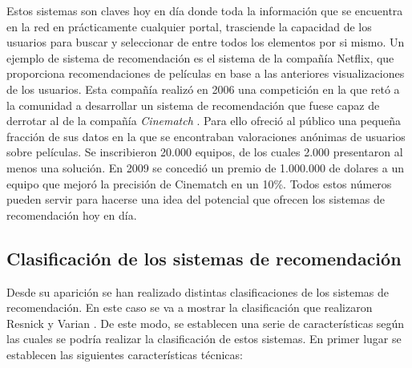 Estos sistemas son claves hoy en día donde toda la información que se encuentra en la red en prácticamente cualquier portal, trasciende la capacidad de los usuarios para buscar y seleccionar de entre todos los elementos por si mismo. Un ejemplo de sistema de recomendación es el sistema de la compañía Netflix, que proporciona recomendaciones de películas en base a las anteriores visualizaciones de los usuarios. Esta compañía realizó en 2006 una competición en la que retó a la comunidad a desarrollar un sistema de recomendación que fuese capaz de derrotar al de la compañía \textit{Cinematch}%
. Para ello ofreció al público una pequeña fracción de sus datos en la que se encontraban valoraciones anónimas de usuarios sobre películas. Se inscribieron 20.000 equipos, de los cuales 2.000 presentaron al menos una solución. En 2009 se concedió un premio de 1.000.000 de dolares a un equipo que mejoró la precisión de Cinematch en un 10\%. Todos estos números pueden servir para hacerse una idea del potencial que ofrecen los sistemas de recomendación hoy en día.

\subsection{Clasificación de los sistemas de recomendación}

Desde su aparición se han realizado distintas clasificaciones de los sistemas de recomendación. En este caso se va a mostrar la clasificación que realizaron Resnick y Varian \cite{Resnick:1997:RS:245108.245121}. De este modo, se establecen una serie de características según las cuales se podría realizar la clasificación de estos sistemas. En primer lugar se establecen las siguientes características técnicas:

